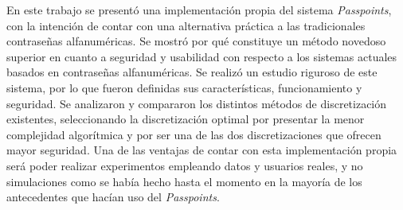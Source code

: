 \begin{conclusions}
   En  este  trabajo  se  presentó  una  implementación  propia  del  sistema  \textit{Passpoints},  con  la  intención  de  contar  con  una alternativa práctica a las tradicionales contraseñas alfanuméricas. Se mostró por qué constituye un método novedoso superior en cuanto a seguridad y usabilidad con respecto a los sistemas actuales basados en contraseñas alfanuméricas. Se  realizó  un  estudio  riguroso  de  este  sistema,  por  lo  que  fueron  definidas  sus  características,  funcionamiento  y seguridad.  Se  analizaron  y  compararon  los  distintos  métodos  de  discretización  existentes,  seleccionando  la discretización optimal por presentar la menor complejidad algorítmica y por ser una de las dos discretizaciones que ofrecen  mayor  seguridad.  Una  de  las  ventajas  de  contar  con  esta  implementación  propia  será  poder  realizar experimentos  empleando  datos  y  usuarios  reales,  y  no simulaciones  como  se  había  hecho  hasta  el  momento  en  la mayoría de los antecedentes que hacían uso del \textit{Passpoints}.
\end{conclusions}
